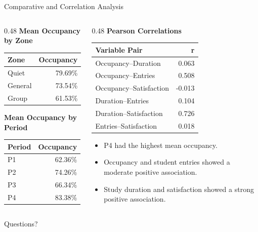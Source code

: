 \documentclass[aspectratio=169,11pt]{beamer}
\begin{document}
\begin{frame}{Comparative and Correlation Analysis}
	\scriptsize
	
	\begin{columns}[T]
		
		\begin{column}{0.48\textwidth}
			\textbf{Mean Occupancy by Zone}
			
			\begin{tabular}{lr}
				\toprule
				\textbf{Zone} & \textbf{Occupancy} \\
				\midrule
				Quiet & 79.69\% \\
				General & 73.54\% \\
				Group & 61.53\% \\
				\bottomrule
			\end{tabular}
			
			\vspace{0.25cm}
			
			\textbf{Mean Occupancy by Period}
			
			\begin{tabular}{lr}
				\toprule
				\textbf{Period} & \textbf{Occupancy} \\
				\midrule
				P1 & 62.36\% \\
				P2 & 74.26\% \\
				P3 & 66.34\% \\
				P4 & 83.38\% \\
				\bottomrule
			\end{tabular}
		\end{column}
		
		\begin{column}{0.48\textwidth}
			\textbf{Pearson Correlations}
			
			\begin{tabular}{lr}
				\toprule
				\textbf{Variable Pair} & \textbf{r} \\
				\midrule
				Occupancy--Duration & 0.063 \\
				Occupancy--Entries & 0.508 \\
				Occupancy--Satisfaction & -0.013 \\
				Duration--Entries & 0.104 \\
				Duration--Satisfaction & 0.726 \\
				Entries--Satisfaction & 0.018 \\
				\bottomrule
			\end{tabular}
			
			\vspace{0.25cm}
			
			\begin{itemize}
				\item P4 had the highest mean occupancy.
				\item Occupancy and student entries showed a moderate positive association.
				\item Study duration and satisfaction showed a strong positive association.
			\end{itemize}
		\end{column}
		
	\end{columns}
\end{frame}

\begin{frame}
    \centering
    \Huge Questions?
\end{frame}
\end{document}
